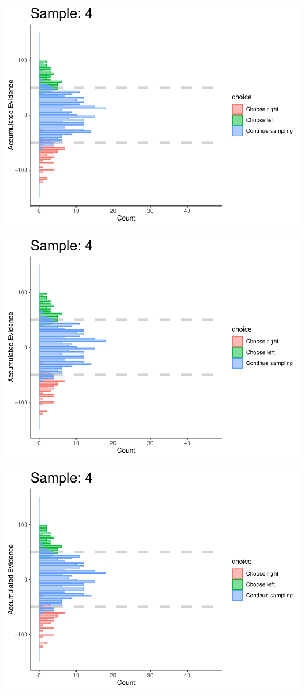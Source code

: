 \documentclass[
]{book}
\begin{document}
\begin{center}\includegraphics[width=0.8\linewidth]{LateNightBayes_files/figure-latex/fixed_check-34} \end{center}

\begin{center}\includegraphics[width=0.8\linewidth]{LateNightBayes_files/figure-latex/fixed_check-35} \end{center}

\begin{center}\includegraphics[width=0.8\linewidth]{LateNightBayes_files/figure-latex/fixed_check-36} \end{center}
\end{document}
